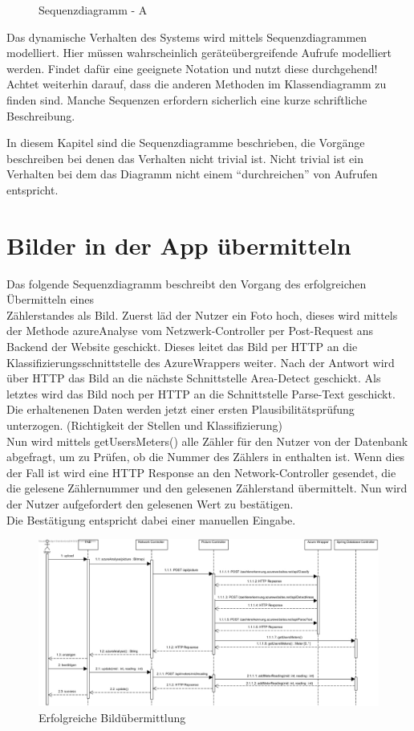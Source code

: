 \begin{figure}[h]
	\centering
	\caption{Sequenzdiagramm - A}
	\label{fig:sequenz-a}
\end{figure}


\begin{tcolorbox}
Das dynamische Verhalten des Systems wird mittels Sequenzdiagrammen modelliert.
Hier müssen wahrscheinlich geräteübergreifende Aufrufe modelliert werden.
Findet dafür eine geeignete Notation und nutzt diese durchgehend! 
Achtet weiterhin darauf, dass die anderen Methoden im Klassendiagramm zu finden sind.
Manche Sequenzen erfordern sicherlich eine kurze schriftliche Beschreibung.
\end{tcolorbox}

In diesem Kapitel sind die Sequenzdiagramme beschrieben, die Vorgänge beschreiben bei denen das Verhalten nicht trivial ist.
Nicht trivial ist ein Verhalten bei dem das Diagramm nicht einem ``durchreichen'' von Aufrufen entspricht.
 
\section{Bilder in der App übermitteln}
Das folgende Sequenzdiagramm beschreibt den Vorgang des erfolgreichen Übermitteln eines \\Zählerstandes als Bild.
Zuerst läd der Nutzer ein Foto hoch, dieses wird mittels der Methode azureAnalyse vom Netzwerk-Controller per Post-Request ans Backend der Website geschickt. Dieses leitet das Bild per HTTP an die Klassifizierungsschnittstelle des AzureWrappers weiter. Nach der Antwort wird über HTTP das Bild an die nächste Schnittstelle Area-Detect geschickt. Als letztes wird das Bild noch per HTTP an die Schnittstelle Parse-Text geschickt. Die erhaltenenen Daten werden jetzt einer ersten Plausibilitätsprüfung unterzogen. (Richtigkeit der Stellen und Klassifizierung) \\
Nun wird mittels getUsersMeters() alle Zähler für den Nutzer von der Datenbank abgefragt, um zu Prüfen, ob die Nummer des Zählers in enthalten ist.
Wenn dies der Fall ist wird eine HTTP Response an den Network-Controller gesendet, die die gelesene Zählernummer und den gelesenen Zählerstand übermittelt. Nun wird der Nutzer aufgefordert den gelesenen Wert zu bestätigen. \\
Die Bestätigung entspricht dabei einer manuellen Eingabe.
\begin{figure}[H]
	\centering
	\caption{Erfolgreiche Bildübermittlung}
	\includegraphics[width=16cm]{img/diagrams/SubmitFotoSequence}
\end{figure}


